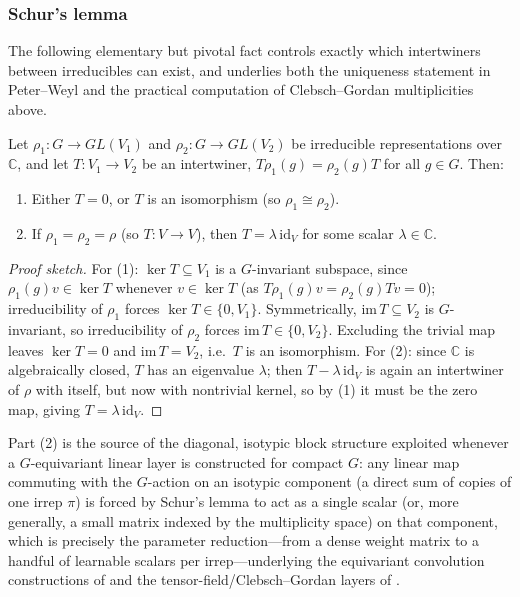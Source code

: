 \documentclass[mathematics,review,submit,moreauthors]{Definitions/mdpi}
\begin{document}
\subsubsection{Schur's lemma}
\label{subsubsec:schurs-lemma}

The following elementary but pivotal fact controls exactly which
intertwiners between irreducibles can exist, and underlies both the
uniqueness statement in Peter--Weyl and the practical computation of
Clebsch--Gordan multiplicities above.

\begin{Lemma}[Schur]
\label{lem:schur}
Let $\rho_1 : G \to GL(V_1)$ and $\rho_2 : G \to GL(V_2)$ be irreducible
representations over $\mathbb{C}$, and let $T : V_1 \to V_2$ be an
intertwiner, $T\rho_1(g) = \rho_2(g) T$ for all $g \in G$. Then:
\begin{enumerate}
    \item Either $T = 0$, or $T$ is an isomorphism (so $\rho_1 \cong \rho_2$).
    \item If $\rho_1 = \rho_2 = \rho$ (so $T : V \to V$), then
    $T = \lambda\, \mathrm{id}_V$ for some scalar $\lambda \in \mathbb{C}$.
\end{enumerate}
\end{Lemma}

\begin{proof}[Proof sketch]
For (1): $\ker T \subseteq V_1$ is a $G$-invariant subspace, since
$\rho_1(g)v \in \ker T$ whenever $v \in \ker T$ (as $T\rho_1(g)v =
\rho_2(g)Tv = 0$); irreducibility of $\rho_1$ forces $\ker T \in \{0, V_1\}$.
Symmetrically, $\mathrm{im}\, T \subseteq V_2$ is $G$-invariant, so
irreducibility of $\rho_2$ forces $\mathrm{im}\, T \in \{0, V_2\}$. Excluding
the trivial map leaves $\ker T = 0$ and $\mathrm{im}\, T = V_2$, i.e.\ $T$ is
an isomorphism. For (2): since $\mathbb{C}$ is algebraically closed, $T$ has
an eigenvalue $\lambda$; then $T - \lambda\,\mathrm{id}_V$ is again an
intertwiner of $\rho$ with itself, but now with nontrivial kernel, so by (1)
it must be the zero map, giving $T = \lambda\,\mathrm{id}_V$.
\end{proof}

Part (2) is the source of the diagonal, isotypic block structure exploited
whenever a $G$-equivariant linear layer is constructed for compact $G$: any
linear map commuting with the $G$-action on an isotypic component (a direct
sum of copies of one irrep $\pi$) is forced by Schur's lemma to act as a
single scalar (or, more generally, a small matrix indexed by the
multiplicity space) on that component, which is precisely the parameter
reduction---from a dense weight matrix to a handful of learnable
scalars per irrep---underlying the equivariant convolution constructions of
\cite{cohen2014} and the tensor-field/Clebsch--Gordan layers of
\cite{kondor2018p3icml}.
\end{document}
